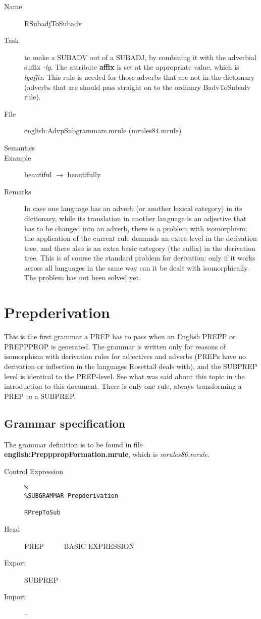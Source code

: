 \vspace{1 cm}
\begin{description}
\item[Name] RSubadjToSubadv
\item[Task] to make a SUBADV out of a SUBADJ, by combining it with the 
adverbial suffix {\em -ly\/}. The 
attribute {\bf affix} is set at the appropriate value, which is 
{\em lyaffix\/}. This rule is needed for those adverbs that are not in the 
dictionary (adverbs that are should pass straight on to 
the ordinary BadvToSubadv rule).
\item[File] english:AdvpSubgrammars.mrule (mrules84.mrule)
\item[Semantics]
\item[Example] beautiful $\rightarrow$ beautifully
\item[Remarks] In case one language has an adverb (or another lexical category) 
in its dictionary, while its translation in another language is an adjective 
that has to be changed into an adverb, there is a problem with isomorphism: the 
application of the current rule demands an extra level in the derivation tree, 
and there also is an extra basic category (the suffix) in the derivation tree.
This is of course the standard problem for derivation: only if it works across 
all languages in the same way can it be dealt with isomorphically. 
The problem has not been solved yet.
\end{description}

\newpage
\section{Prepderivation}
This is the first grammar a PREP has to pass when an English PREPP or PREPPPROP 
is generated. The grammar is 
written only for reasons of isomorphism with derivation rules for adjectives 
and adverbs (PREPs have no derivation or inflection in the languages Rosetta3 
deals with), and the SUBPREP level is identical to the PREP-level. See what was 
said about this topic in the introduction to this document. There is only one 
rule, always transforming a PREP to a SUBPREP. 

\subsection{Grammar specification}
The grammar definition is to be found in file {\bf 
english:PrepppropFormation.mrule}, which is {\em mrules86.mrule\/}.

\begin{description}
\item[Control Expression] \mbox{}
   \begin{verbatim}
%
%SUBGRAMMAR Prepderivation

RPrepToSub 
   \end{verbatim}
\item[Head]    PREP \ \ \ \ \ BASIC EXPRESSION 
\item[Export]  SUBPREP
\item[Import] --
\end{description}


